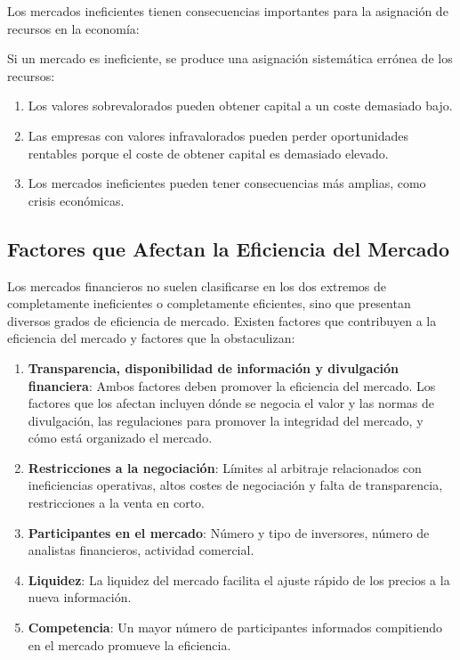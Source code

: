 Los mercados ineficientes tienen consecuencias importantes para la asignación de recursos en la economía:

\begin{proposicion}
Si un mercado es ineficiente, se produce una asignación sistemática errónea de los recursos:
\begin{enumerate}
\item Los valores sobrevalorados pueden obtener capital a un coste demasiado bajo.
\item Las empresas con valores infravalorados pueden perder oportunidades rentables porque el coste de obtener capital es demasiado elevado.
\item Los mercados ineficientes pueden tener consecuencias más amplias, como crisis económicas.
\end{enumerate}
\end{proposicion}

\subsection{Factores que Afectan la Eficiencia del Mercado}

Los mercados financieros no suelen clasificarse en los dos extremos de completamente ineficientes o completamente eficientes, sino que presentan diversos grados de eficiencia de mercado. Existen factores que contribuyen a la eficiencia del mercado y factores que la obstaculizan:

\begin{enumerate}
\item \textbf{Transparencia, disponibilidad de información y divulgación financiera}: Ambos factores deben promover la eficiencia del mercado. Los factores que los afectan incluyen dónde se negocia el valor y las normas de divulgación, las regulaciones para promover la integridad del mercado, y cómo está organizado el mercado.

\item \textbf{Restricciones a la negociación}: Límites al arbitraje relacionados con ineficiencias operativas, altos costes de negociación y falta de transparencia, restricciones a la venta en corto.

\item \textbf{Participantes en el mercado}: Número y tipo de inversores, número de analistas financieros, actividad comercial.

\item \textbf{Liquidez}: La liquidez del mercado facilita el ajuste rápido de los precios a la nueva información.

\item \textbf{Competencia}: Un mayor número de participantes informados compitiendo en el mercado promueve la eficiencia.
\end{enumerate}


